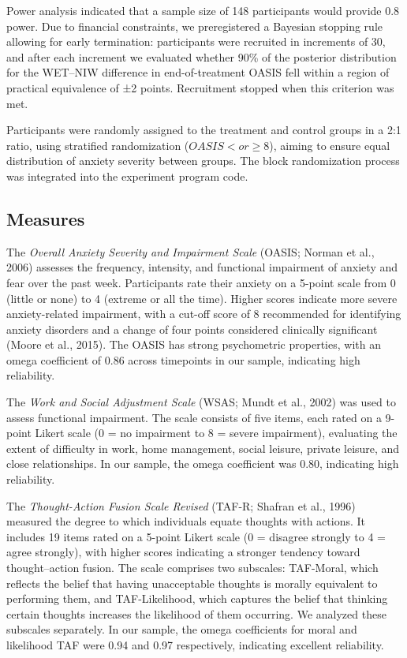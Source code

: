 \documentclass[
  man,floatsintext]{apa7}
\begin{document}
Power analysis indicated that a sample size of 148 participants would provide 0.8 power.
Due to financial constraints, we preregistered a Bayesian stopping rule allowing for early termination: participants were recruited in increments of 30, and after each increment we evaluated whether 90\% of the posterior distribution for the WET--NIW difference in end-of-treatment OASIS fell within a region of practical equivalence of ±2 points.
Recruitment stopped when this criterion was met.

Participants were randomly assigned to the treatment and control groups in a 2:1 ratio, using stratified randomization (\(OASIS < or \geq 8\)), aiming to ensure equal distribution of anxiety severity between groups.
The block randomization process was integrated into the experiment program code.

\subsection{Measures}\label{measures}

The \emph{Overall Anxiety Severity and Impairment Scale} (OASIS; Norman et al., 2006) assesses the frequency, intensity, and functional impairment of anxiety and fear over the past week.
Participants rate their anxiety on a 5-point scale from 0 (little or none) to 4 (extreme or all the time).
Higher scores indicate more severe anxiety-related impairment, with a cut-off score of 8 recommended for identifying anxiety disorders and a change of four points considered clinically significant (Moore et al., 2015).
The OASIS has strong psychometric properties, with an omega coefficient of 0.86 across timepoints in our sample, indicating high reliability.

The \emph{Work and Social Adjustment Scale} (WSAS; Mundt et al., 2002) was used to assess functional impairment.
The scale consists of five items, each rated on a 9-point Likert scale (0 = no impairment to 8 = severe impairment), evaluating the extent of difficulty in work, home management, social leisure, private leisure, and close relationships.
In our sample, the omega coefficient was 0.80, indicating high reliability.

The \emph{Thought-Action Fusion Scale Revised} (TAF-R; Shafran et al., 1996) measured the degree to which individuals equate thoughts with actions.
It includes 19 items rated on a 5-point Likert scale (0 = disagree strongly to 4 = agree strongly), with higher scores indicating a stronger tendency toward thought--action fusion.
The scale comprises two subscales: TAF-Moral, which reflects the belief that having unacceptable thoughts is morally equivalent to performing them, and TAF-Likelihood, which captures the belief that thinking certain thoughts increases the likelihood of them occurring.
We analyzed these subscales separately.
In our sample, the omega coefficients for moral and likelihood TAF were 0.94 and 0.97 respectively, indicating excellent reliability.
\end{document}

